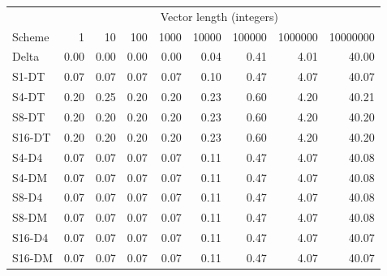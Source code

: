 \begin{tabular}{lrrrrrrrr}
\toprule
 & \multicolumn{8}{c}{Vector length (integers)} \\
Scheme & 1 & 10 & 100 & 1000 & 10000 & 100000 & 1000000 & 10000000 \\
\midrule
Delta & 0.00 & 0.00 & 0.00 & 0.00 & 0.04 & 0.41 & 4.01 & 40.00 \\
S1-DT & 0.07 & 0.07 & 0.07 & 0.07 & 0.10 & 0.47 & 4.07 & 40.07 \\
S4-DT & 0.20 & 0.25 & 0.20 & 0.20 & 0.23 & 0.60 & 4.20 & 40.21 \\
S8-DT & 0.20 & 0.20 & 0.20 & 0.20 & 0.23 & 0.60 & 4.20 & 40.20 \\
S16-DT & 0.20 & 0.20 & 0.20 & 0.20 & 0.23 & 0.60 & 4.20 & 40.20 \\
S4-D4 & 0.07 & 0.07 & 0.07 & 0.07 & 0.11 & 0.47 & 4.07 & 40.08 \\
S4-DM & 0.07 & 0.07 & 0.07 & 0.07 & 0.11 & 0.47 & 4.07 & 40.08 \\
S8-D4 & 0.07 & 0.07 & 0.07 & 0.07 & 0.11 & 0.47 & 4.07 & 40.08 \\
S8-DM & 0.07 & 0.07 & 0.07 & 0.07 & 0.11 & 0.47 & 4.07 & 40.08 \\
S16-D4 & 0.07 & 0.07 & 0.07 & 0.07 & 0.11 & 0.47 & 4.07 & 40.07 \\
S16-DM & 0.07 & 0.07 & 0.07 & 0.07 & 0.11 & 0.47 & 4.07 & 40.07 \\
\bottomrule
\end{tabular}
